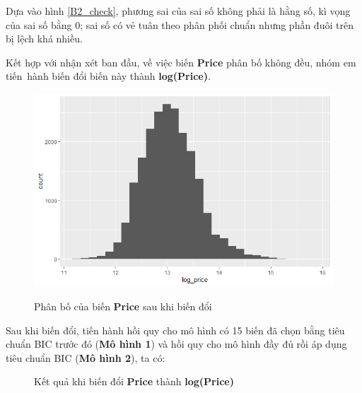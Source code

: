  Dựa vào hình \ref{B2_check}, phương sai của sai số không phải là hằng số, kì vọng của sai số bằng 0; sai số có vẻ tuân theo phân phối chuẩn nhưng phần đuôi trên bị lệch khá nhiều. 
 
 Kết hợp với nhận xét ban đầu, về việc biến \textbf{Price} phân bố không đều, nhóm em tiến~hành biến đổi biến này thành \textbf{log(Price)}.
 
 \begin{figure}[h!]
 	\centering
 	{\includegraphics[width=.6\linewidth]{../Photo Of Result/B2_logprice}}
 	\caption{Phân bố của biến \textbf{Price} sau khi biến đổi }
 	\label{B2_log}
 \end{figure}
 Sau khi biến đổi, tiến hành hồi quy cho mô hình có 15 biến đã chọn bằng tiêu chuẩn BIC trước đó (\textbf{Mô hình 1}) và hồi quy cho mô hình đầy đủ rồi áp dụng tiêu chuẩn BIC (\textbf{Mô hình 2}), ta có:
 
  \begin{figure}[h!]
 	\centering
 	\hfill
 	\caption{Kết quả khi biến đổi \textbf{Price} thành \textbf{log(Price)}}
 \end{figure}
 

